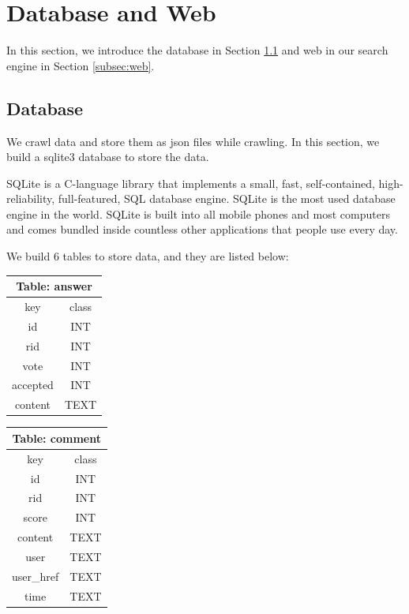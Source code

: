 \documentclass[10pt,journal,compsoc]{IEEEtran}
\begin{document}
\section{Database and Web}
\label{sec:database_and_web}

In this section, we introduce the database in Section \ref{subsec:database} and web in our search engine in Section \ref{subsec:web}.  

\subsection{Database}
\label{subsec:database}


We crawl data and store them as json files while crawling. In this section, we build a sqlite3 database to store the data.

SQLite is a C-language library that implements a small, fast, self-contained, high-reliability, full-featured, SQL database engine. SQLite is the most used database engine in the world. SQLite is built into all mobile phones and most computers and comes bundled inside countless other applications that people use every day.

We build 6 tables to store data, and they are listed below:

\begin{table}[H]
\centering
\begin{tabular}{cc}
\toprule
\multicolumn{2}{c}{\textbf{Table: answer}} \\
\midrule
key                   & class             \\
\midrule
id                    & INT               \\
rid                   & INT               \\
vote                  & INT               \\
accepted              & INT               \\
content               & TEXT   \\  
\bottomrule
\end{tabular}
\end{table}

\begin{table}[H]
\centering
\begin{tabular}{cc}
\toprule
\multicolumn{2}{c}{\textbf{Table: comment}} \\
\midrule
key                   & class             \\
\midrule
id                    & INT               \\
rid                   & INT               \\
score                  & INT               \\
content              & TEXT               \\
user               & TEXT   \\ 
user\_href      & TEXT \\
time  & TEXT\\
\bottomrule
\end{tabular}
\end{table}
\end{document}
